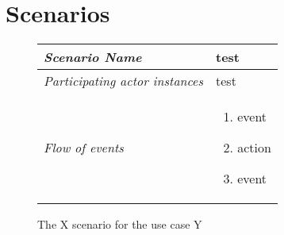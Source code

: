 \section{Scenarios}

\begin{figure}[htb]
	\centering
	\begin{longtable}{p{3cm} @{\hskip 1cm} p{12cm}}
		\hline
		\textit{Scenario Name} & test\\
		\hline
		\textit{Participating actor instances} & test\\
		\hline
		\textit{Flow of events} & 
			\begin{enumerate}
				\item event
				\item action
				\item event
			\end{enumerate}
			\\
		\hline
	\end{longtable}
	\caption{The X scenario for the use case Y}
\end{figure}


%
%
%
%